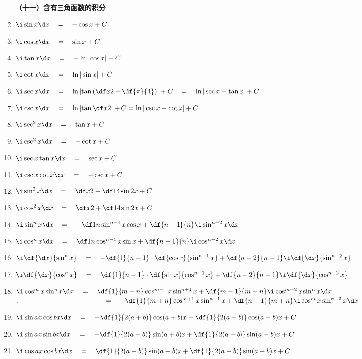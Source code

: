 \begin{enumerate}
\bigskip
{\bf （十一）含有三角函数的积分}
  \item $\i\sin x{\d x}\quad=\quad-\cos x+C$
  \item $\i\cos x{\d x}\quad=\quad\sin x+C$
  \item $\i\tan x{\d x}\quad=\quad-\ln|\cos x|+C$
  \item $\i\cot x{\d x}\quad=\quad\ln|\sin x|+C$
  \item $\i\sec x{\d x}\quad=\quad\ln\left|\tan\left(\df
  x2+\df{\pi}{4}\right)\right|+C\quad=\quad\ln|\sec x+\tan x|+C$
  \item $\i\csc x{\d x}\quad=\quad\ln\left|\tan\df x2\right|+C=\ln|\csc x-\cot x|+C$
  \item $\i\sec^2x{\d x}\quad=\quad\tan x+C$
  \item $\i\csc^2x{\d x}\quad=\quad-\cot x+C$
  \item $\i\sec x\tan x{\d x}\quad=\quad\sec x+C$
  \item $\i\csc x\cot x{\d x}\quad=\quad-\csc x+C$
  \item $\i\sin^2x{\d x}\quad=\quad\df x2-\df 14\sin 2x+C$
  \item $\i\cos^2x{\d x}\quad=\quad\df x2+\df 14\sin 2x+C$
  \item $\i\sin^nx{\d x}\quad=\quad-\df 1n\sin^{n-1}x\cos
  x+\df{n-1}{n}\i\sin^{n-2}x{\d x}$
  \item $\i\cos^nx{\d x}\quad=\quad\df 1n\cos^{n-1}x\sin
  x+\df{n-1}{n}\i\cos^{n-2}x{\d x}$
  \item $\i\df{{\d x}}{\sin^nx}\quad=\quad-\df{1}{n-1}\cdot\df{\cos x}{\sin^{n-1}x}
  +\df{n-2}{n-1}\i\df{{\d x}}{\sin^{n-2}x}$
  \item $\i\df{{\d x}}{\cos^nx}\quad=\quad\df{1}{n-1}\cdot\df{\sin x}{\cos^{n-1}x}
  +\df{n-2}{n-1}\i\df{{\d x}}{\cos^{n-2}x}$
  \item
  $\i\cos^mx\sin^nx{\d x}\quad=\quad\df{1}{m+n}\cos^{m-1}x\sin^{n+1}x+\df{m-1}{m+n}\i\cos^{m-2}x\sin^nx{\d x}$\\
  $.\hspace{4cm}\quad=\quad-\df{1}{m+n}\cos^{m+1}x\sin^{n-1}x+\df{n-1}{m+n}\i\cos^mx\sin^{n-2}x{\d x}$
  \item $\i\sin ax\cos
  bx{\d x}\quad=\quad-\df{1}{2(a+b)}\cos(a+b)x-\df{1}{2(a-b)}\cos(a-b)x+C$
  \item $\i\sin ax\sin
  bx{\d x}\quad=\quad-\df{1}{2(a+b)}\sin(a+b)x+\df{1}{2(a-b)}\sin(a-b)x+C$
  \item $\i\cos ax\cos bx{\d x}\quad=\quad\df{1}{2(a+b)}\sin(a+b)x+\df{1}{2(a-b)}\sin(a-b)x+C$

\end{enumerate}
